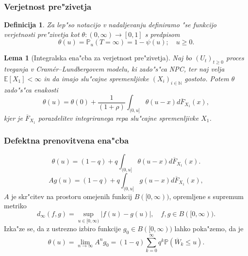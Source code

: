 \documentclass[]{beamer} %
\theoremstyle{plain}
\newtheorem{definicija}{Definicija}
\newtheorem{lema}{Lema}
\newcommand{\N}{\mathbb{N}}
\newcommand{\E}{\mathbb{E}}
\newcommand{\Prob}{\mathbb{P}}
\begin{document}
\begin{frame}
  \frametitle{Verjetnost pre"zivetja}
  \begin{definicija}
    Za lep"so notacijo v nadaljevanju definiramo "se funkcijo \textit{verjetnosti pre"zivetja} kot
    $\theta:(0, \infty) \to [0, 1]$ s predpisom
    \begin{equation*}
        \theta(u) = \Prob_u\left(T=\infty\right) = 1 - \psi(u); \quad u\geq 0.
    \end{equation*}
    \label{def:verjetnostPrezivetja}
  \end{definicija}
  \pause
  \begin{lema}[Integralska ena"cba za verjetnost pre"zivetja]
    Naj bo $(U_t)_{t\geq0}$ proces tveganja v Cramér--Lundbergovem modelu, ki zado"s"ca NPC, ter naj 
    velja $\E\left[X_1\right]<\infty$ in da imajo slu"cajne spremenljivke $(X_i)_{i\in\N}$ 
    gostoto. Potem $\theta$ zado"s"ca  enakosti
    \begin{equation*}
        \theta(u) = \theta(0) + \frac{1}{(1+\rho)} \int_{(0, u]}\theta(u - x)d\overline{F}_{X_1}(x),
    \end{equation*}
    kjer je $\overline{F}_{X_1}$ porazdelitev integriranega repa  
    slu"cajne spremenljivke $X_1$.
    \label{lema:verjetnostPrezivetja}
  \end{lema}
\end{frame}

\begin{frame}
  \frametitle{Defektna prenovitvena ena"cba}
  \begin{equation*}
    \theta(u) = (1 - q) + q\int_{(0, u]}\theta(u - x)d\overline{F}_{X_1}(x).
  \end{equation*}
  \pause
  \begin{equation*}
    Ag(u) = (1 - q) + q\int_{(0, u]}g(u - x)d\overline{F}_{X_1}(x),
    \label{eq:operator}
  \end{equation*}
  \pause
  $A$ je skr"citev na prostoru omejenih funkcij $B([0, \infty))$, opremljene s supremum metriko
  \begin{equation*}
    d_\infty(f, g) = \sup_{u\in[0, \infty)}\big|f(u) - g(u)\big|,  \quad f, g\in B([0, \infty)).
  \end{equation*}
  \pause
  Izka"ze se, da z ustrezno izbiro funkcije $g_0\in B([0, \infty))$ lahko poka"zemo, da je 
  \begin{equation*}
    \theta(u) = \lim_{n\to\infty} A^ng_0 = (1 - q)\sum_{k = 0}^\infty q^k\Prob\left(\overline{W}_k \leq u\right).
  \end{equation*}
\end{frame}
\end{document}
